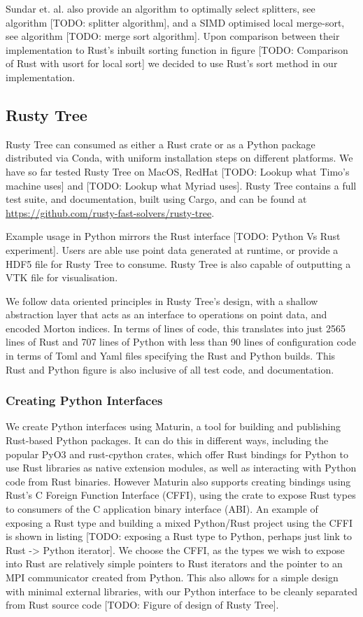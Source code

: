 Sundar et. al. also provide an algorithm to optimally select splitters, see algorithm [TODO: splitter algorithm], and a SIMD optimised local merge-sort, see algorithm [TODO: merge sort algorithm]. Upon comparison between their implementation to Rust's inbuilt sorting function in figure [TODO: Comparison of Rust with usort for local sort] we decided to use Rust's sort method in our implementation.

\subsection*{Rusty Tree}

Rusty Tree can consumed as either a Rust crate or as a Python package distributed via Conda, with uniform installation steps on different platforms. We have so far tested Rusty Tree on MacOS, RedHat [TODO: Lookup what Timo's machine uses] and [TODO: Lookup what Myriad uses]. Rusty Tree contains a full test suite, and documentation, built using Cargo, and can be found at \url{https://github.com/rusty-fast-solvers/rusty-tree}.

Example usage in Python mirrors the Rust interface [TODO: Python Vs Rust experiment]. Users are able use point data generated at runtime, or provide a HDF5 file for Rusty Tree to consume. Rusty Tree is also capable of outputting a VTK file for visualisation.

We follow data oriented principles in Rusty Tree's design, with a shallow abstraction layer that acts as an interface to operations on point data, and encoded Morton indices. In terms of lines of code, this translates into just 2565 lines of Rust and 707 lines of Python with less than 90 lines of configuration code in terms of Toml and Yaml files specifying the Rust and Python builds. This Rust and Python figure is also inclusive of all test code, and documentation. 

\subsubsection*{Creating Python Interfaces}

We create Python interfaces using Maturin, a tool for building and publishing Rust-based Python packages. It can do this in different ways, including the popular PyO3 \cite{pyo32022github} and rust-cpython \cite{rustcpython2022github} crates, which offer Rust bindings for Python to use Rust libraries as native extension modules, as well as interacting with Python code from Rust binaries. However Maturin also supports creating bindings using Rust's C Foreign Function Interface (CFFI), using the  crate to expose Rust types to consumers of the C application binary interface (ABI). An example of exposing a Rust type and building a mixed Python/Rust project using the CFFI is shown in listing [TODO: exposing a Rust type to Python, perhaps just link to Rust -> Python iterator]. We choose the CFFI, as the types we wish to expose into Rust are relatively simple pointers to Rust iterators and the pointer to an MPI communicator created from Python. This also allows for a simple design with minimal external libraries, with our Python interface to be cleanly separated from Rust source code [TODO: Figure of design of Rusty Tree].

